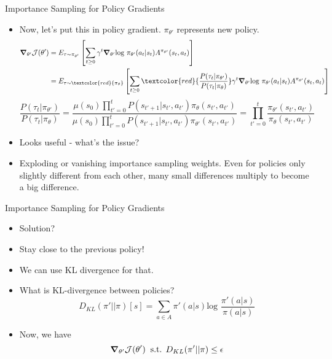 \begin{frame}{Importance Sampling for Policy Gradients}
\begin{itemize}
    \item Now, let's put this in policy gradient. $\pi_{\theta'}$ represents new policy.
    \begin{equation*}
    \begin{split}
        \gradient_{\theta'} \mathcal{J}({\theta'}) & = E_{\tau \sim \pi_{\theta'}} \left [ \sum_{t \geq 0} \gamma^t \gradient_{\theta'} \text{log } \pi_{\theta'} (a_t|s_t) A^{\pi_{\theta'}}(s_t,a_t) \right ] \\
        & = E_{\tau \sim \textcolor{red}{\pi_{\theta}}} \left [ \sum_{t \geq 0} \textcolor{red}{\frac{P(\tau_t|\pi_{\theta'})}{P(\tau_t|\pi_{\theta})}} \gamma^t \gradient_{\theta'} \text{log } \pi_{\theta'} (a_t|s_t) A^{\pi_{\theta'}}(s_t,a_t) \right ] \\
    \end{split}
    \end{equation*}
    \pause
    $$\frac{P(\tau_t|\pi_{\theta'})}{P(\tau_t|\pi_{\theta})} = \frac{\mu(s_0)\prod_{t'=0}^{t}P(s_{t'+1}|s_{t'}, a_{t'})\pi_\theta (s_{t'}, a_{t'})}{\mu(s_0)\prod_{t'=0}^{t}P(s_{t'+1}|s_{t'}, a_{t'})\pi_{\theta'} (s_{t'}, a_{t'})} = \prod_{t'=0}^{t} \frac{\pi_{\theta'} (s_{t'}, a_{t'})}{\pi_{\theta} (s_{t'}, a_{t'})}$$
    \pause
    \item Looks useful - what’s the issue? \pause
    \item Exploding or vanishing importance sampling weights. Even for policies only slightly different from each other, many small differences multiply to become a big difference.

\end{itemize}
    
\end{frame}

\begin{frame}{Importance Sampling for Policy Gradients}
    \begin{itemize}
        \item Solution?
        \pause
        \item Stay close to the previous policy!
        \item We can use KL divergence for that. 
        \item What is KL-divergence between policies?
        $$D_{KL}(\pi' || \pi)[s] = \sum_{a \in A} \pi'(a|s) \text{log } \frac{\pi'(a|s)}{\pi(a|s)}$$
        \pause
        \item Now, we have
        $$\gradient_{\theta'} \mathcal{J}({\theta'}) \: \text{ s.t. } D_{KL}(\pi' || \pi) \leq \epsilon$$
    \end{itemize}
    
\end{frame}